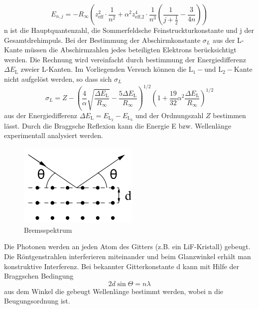 \begin{equation}
    E_{n,j} = -R_{\infty}\left(z_{\text{eff}}^2 \cdot \frac{1}{n^2} + \alpha^2 z_{\text{eff,2}}^4 \cdot \frac{1}{n^3} \left( \frac{1}{j + \frac{1}{2}} - \frac{3}{4n}\right)\right)
    \label{eqn:gl3}
\end{equation}
n ist die Hauptquantenzahl, \alpha die Sommerfeldsche Feinstruckturkonstante und j der Gesamtdrehimpuls.
Bei der Bestimmung der Abschirmkonstante ${\sigma}_L$ aus der L-Kante müssen die Abschirmzahlen jedes beteiligten Elektrons berücksichtigt werden.
Die Rechnung wird vereinfacht durch bestimmung der Energiedifferenz $\Delta E_{\text{L}}$ zweier L-Kanten.
Im Vorliegenden Versuch können die $\text{L}_1- \text{und L}_2-$Kante nicht aufgelöst werden, so dass sich ${\sigma}_L$
\begin{equation}
    {\sigma}_L = Z - \left(\frac{4}{\alpha}\sqrt{\frac{\Delta E_{\text{L}}}{R_{\infty}}} - \frac{5 \Delta E_{\text{L}}}{R_{\infty}}\right)^{1/2}\left(1 + \frac{19}{32}\alpha^2\frac{\Delta E_{\text{L}}}{R_{\infty}}\right)^{1/2}
    \label{eqn:gl3}
\end{equation}
aus der Energiedifferenz $\Delta E_{\text{L}} = E_{\text{$\text{L}_2$}} - E_{\text{$\text{L}_3$}}$ und der Ordnungszahl $Z$ bestimmen lässt.
Durch die Braggsche Reflexion kann die Energie E bzw. Wellenlänge \lambda experimentall analysiert werden.
\begin{figure}
    \centering
    \includegraphics[height=4.0cm]{data/abb3.jpg}
    \caption{Bremsspektrum \cite{V602}}
    \label{fig:abb3}
\end{figure}
Die Photonen werden an jeden Atom des Gitters (z.B. ein LiF-Kristall) gebeugt.
Die Röntgenstrahlen interferieren miteinander und beim Glanzwinkel \Theta erhält man konstruktive Interferenz.
Bei bekannter Gitterkonstante d kann mit Hilfe der Braggschen Bedingung
\begin{equation}
    2 d \sin{\Theta} = n \lambda
\end{equation}
aus dem Winkel \Theta die gebeugt Wellenlänge \lambda bestimmt werden, wobei n die Beugungsordnung ist.

